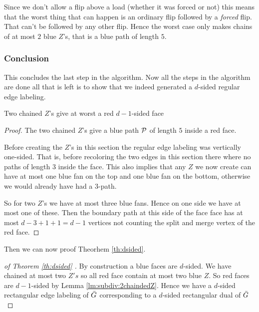 Since we don't allow a flip above a load (whether it was forced or not) this means that the worst thing that can happen is an ordinary flip followed by a \emph{forced} flip. That can't be followed by any other flip. Hence the worst case only makes chains of at most $2$ blue $Z$'s, that is a blue path of length $5$.


\subsubsection{Conclusion}
This concludes the last step in the algorithm.
Now all the steps in the algorithm are done all that is left is to show that we indeed generated a $d$-sided regular edge labeling.
\begin{lemma}
  \label{lm:subdiv:2chaindedZ}
  Two chained $Z$'s give at worst a red $d-1$-sided face
\end{lemma}
\begin{proof}
  The two chained $Z$'s give a blue path $\P$ of length $5$ inside a red face.

  Before creating the $Z$'s in this section the regular edge labeling was vertically one-sided. That is, before recoloring the two edges in this section there where no paths of length $3$ inside the face. This also implies that any $Z$ we now create can have at most one blue fan on the top and one blue fan on the bottom, otherwise we would already have had a $3$-path.

  So for two $Z$'s we have at most three blue fans. Hence on one side we have at most one of these. Then the boundary path at this side of the face face has at most $d-3 + 1 +1 =d-1$ vertices not counting the split and merge vertex of the red face.
\end{proof}

  Then we can now proof Theorhem \ref{th:dsided}.

\begin{proof}[of Theorem \ref{th:dsided} ]
  By construction a blue faces are $d$-sided. We have chained at most two $Z's$ so all red face contain at most two blue $Z$. So red faces are $d-1$-sided by Lemma \ref{lm:subdiv:2chaindedZ}. Hence we have a $d$-sided rectangular edge labeling of $\ext G$ corresponding to a $d$-sided rectangular dual of $\ext G$
\end{proof}
